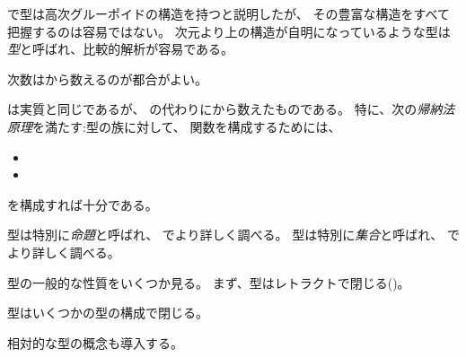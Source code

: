 \documentclass[index]{subfiles}
\begin{document}

で型は高次グルーポイドの構造を持つと説明したが、
その豊富な構造をすべて把握するのは容易ではない。
次元より上の構造が自明になっているような型は
\emph{型}と呼ばれ、比較的解析が容易である。

次数はから数えるのが都合がよい。



\myInlineMath{\myTruncLevel}は実質\myInlineMath{\myNat}と同じであるが、
\myInlineMath{\myNatZero}の代わりに\myInlineMath{\myTLMinusTwo}から数えたものである。
特に、次の\emph{帰納法原理}を満たす:型の族に対して、
関数を構成するためには、
\begin{itemize}
\item {}
\item {}
\end{itemize}
を構成すれば十分である。




\myInlineMath{\myTLMinusOne}型は特別に\emph{命題}と呼ばれ、
でより詳しく調べる。
\myInlineMath{\myTLZero}型は特別に\emph{集合}と呼ばれ、
でより詳しく調べる。

型の一般的な性質をいくつか見る。
まず、型はレトラクトで閉じる()。




型はいくつかの型の構成で閉じる。






相対的な型の概念も導入する。





\begin{mySubsections}
  
  
  
  
  
  
\end{mySubsections}
\end{document}
